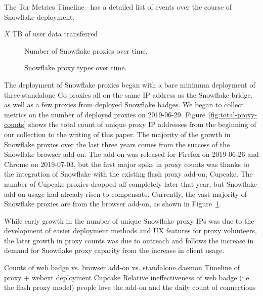 \documentclass[letterpaper,twocolumn]{article}
\begin{document}

The Tor Metrics Timeline~\cite{tor-metrics-timeline}
has a detailed list of events over the course of Snowflake deployment.

$X$ TB of user data transferred

\begin{figure}
\caption{Number of Snowflake proxies over time.}
\label{fig:total-proxy-counts}
\bigskip
{}
\caption{Snowflake proxy types over time.}
\label{fig:proxy-type-counts}
\end{figure}

The deployment of Snowflake proxies began with a bare minimum deployment
of three standalone Go proxies all on the same IP address as the Snowflake bridge,
as well as a few proxies from deployed Snowflake badges.
We began to collect metrics on the number of deployed proxies on \mbox{2019-06-29}.
Figure~\ref{fig:total-proxy-counts} shows the total count of unique proxy IP addresses
from the beginning of our collection to the writing of this paper.
The majority of the growth in Snowflake proxies over the last three years comes from
the success of the Snowflake browser add-on.
The add-on was released for Firefox on \mbox{2019-06-26} and Chrome on \mbox{2019-07-03},
but the first major spike in proxy counts was thanks to the integration
of Snowflake with the existing flash proxy add-on, Cupcake.
The number of Cupcake proxies dropped off completely later that year,
but Snowflake add-on usage had already risen to compensate.
Currently, the vast majority of Snowflake proxies are from the browser add-on,
as shown in Figure~\ref{fig:proxy-type-counts}.

While early growth in the number of unique Snowflake proxy IPs
was due to the development of easier deployment methods and UX features for proxy volunteers,
the later growth in proxy counts was due to outreach
and follows the increase in demand for Snowflake proxy capacity from the increase in client usage. 

Counts of web badge vs. browser add-on vs. standalone daemon
Timeline of proxy + webext deployment
Cupcake
Relative ineffectiveness of web badge (i.e. the flash proxy model)
people love the add-on and the daily count of connections
\end{document}
